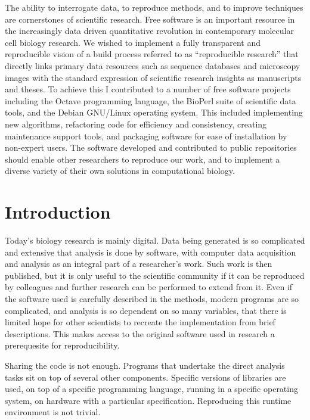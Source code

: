 \begin{chapterabstract}
  The ability to interrogate data, to reproduce methods, and to
  improve techniques are cornerstones of scientific research.  Free
  software is an important resource in the increasingly data driven
  quantitative revolution in contemporary molecular cell biology
  research.  We wished to implement a fully transparent and
  reproducible vision of a build process referred to as ``reproducible
  research'' that directly links primary data resources such as
  sequence databases and microscopy images with the standard
  expression of scientific research insights as manuscripts and
  theses.  To achieve this I contributed to a number of free software
  projects including the Octave programming language, the BioPerl
  suite of scientific data tools, and the Debian GNU/Linux operating
  system.  This included implementing new algorithms, refactoring code
  for efficiency and consistency,
  creating maintenance support tools, and packaging software for ease of
  installation by non-expert users.  The software developed and
  contributed to public repositories should enable other researchers
  to reproduce our work, and to implement a diverse variety of their
  own solutions in computational biology.
\end{chapterabstract}

\section{Introduction}

Today's biology research is mainly digital.  Data being generated is so
complicated and extensive that analysis is done by software, with computer data
acquisition and analysis as an integral part of a researcher's work.
Such work is then published, but it is only useful to the scientific
community if it can be reproduced by colleagues and further
research can be performed to extend from it.  Even if the software used is
carefully described in the methods, modern programs are so
complicated, and analysis is so dependent on so many variables, that
there is limited hope for other scientists to recreate the
implementation from brief descriptions.  This
makes access to the original software used in research a prerequesite for
reproducibility.

Sharing the code is not enough.  Programs that undertake the direct analysis
tasks sit on top of several other components.  Specific versions of
libraries are used, on top of a specific programming language, running
in a specific operating system, on hardware with a particular
specification.  Reproducing this runtime environment is not trivial.

